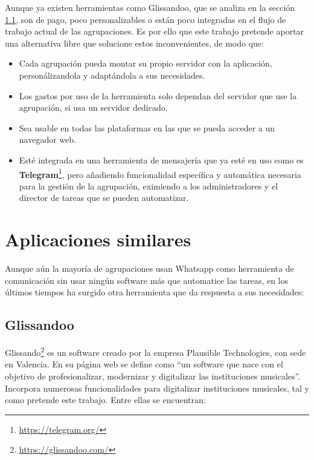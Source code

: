 Aunque ya existen herramientas como Glissandoo, que se analiza en la sección \ref{subsection:glissandoo}, son de pago, poco personalizables o están poco integradas en el flujo de trabajo actual de las agrupaciones. Es por ello que este trabajo pretende aportar una alternativa libre que solucione estos inconvenientes, de modo que:

\begin{itemize}
    \item Cada agrupación pueda montar su propio servidor con la aplicación, personálizandola y adaptándola a sus necesidades.
    \item Los gastos por uso de la herramienta solo dependan del servidor que use la agrupación, si usa un servidor dedicado.
    \item Sea usable en todas las plataformas en las que se pueda acceder a un navegador web.
    \item Esté integrada en una herramienta de mensajería que ya esté en uso como es \textbf{Telegram}\footnote{\url{https://telegram.org/}}, pero añadiendo funcionalidad específica y automática necesaria para la gestión de la agrupación, eximiendo a los administradores y el director de tareas que se pueden automatizar.
\end{itemize}



\section{Aplicaciones similares}

Aunque aún la mayoría de agrupaciones usan Whatsapp como herramienta de comunicación sin usar ningún software más que automatice las tareas, en los últimos tiempos ha surgido otra herramienta que da respuesta a sus necesidades:

\subsection{Glissandoo}\label{subsection:glissandoo}

Glissando\footnote{\url{https://glissandoo.com/}} es un software creado por la empresa Plausible Technologies, con sede en Valencia. En su página web se define como ``un software que nace con el objetivo de profesionalizar, modernizar y digitalizar las instituciones musicales''. Incorpora numerosas funcionalidades para digitalizar instituciones musicales, tal y como pretende este trabajo. Entre ellas se encuentran:

